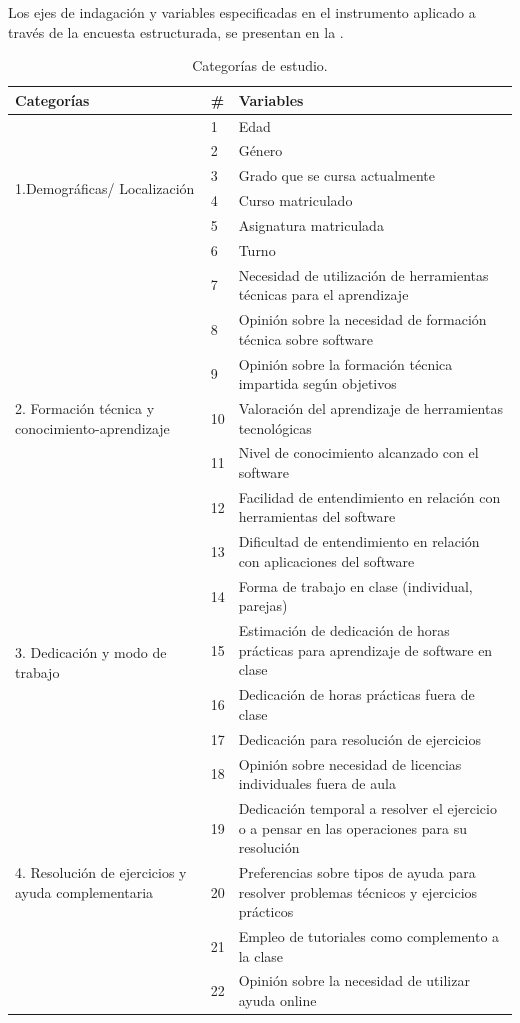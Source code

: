 \documentclass[spanish]{textolivre}
\begin{document}
Los ejes de indagación y variables especificadas en el instrumento aplicado a través de la encuesta estructurada, se presentan en la .

\begin{table}[h]
\centering\small
\begin{threeparttable}
\caption{Categorías de estudio.}
\label{tab-01}
\begin{tabular}{p{3cm} l p{10cm}}
\toprule
Categorías & \# & Variables \\
\midrule
\multirow[t]{6}{=}{1.Demográficas/ Localización} & 1 & Edad\\
	 & 2 & Género \\
	 & 3 & Grado que se cursa actualmente \\
	 & 4 & Curso matriculado\\
	 & 5 & Asignatura matriculada\\
  & 6 & Turno\\[2ex]
\multirow[t]{7}{=}{2. Formación técnica y conocimiento-aprendizaje} & 7 & Necesidad de utilización de herramientas técnicas para el aprendizaje\\
  & 8	& Opinión sobre la necesidad de formación técnica sobre software\\
  & 9	& Opinión sobre la formación técnica impartida según objetivos\\
  & 10 &Valoración del aprendizaje de herramientas tecnológicas\\
  & 11  & Nivel de conocimiento alcanzado con el software\\
  & 12 & Facilidad de entendimiento en relación con herramientas del software\\
  & 13 & Dificultad de entendimiento en relación con aplicaciones del software\\[4ex]
\multirow[t]{4}{=}{3. Dedicación y modo de trabajo} &  14 & Forma de trabajo en clase (individual, parejas)\\
  & 15 & Estimación de dedicación de horas prácticas para aprendizaje de software en clase\\
  & 16 & Dedicación de horas prácticas fuera de clase\\
  & 17 & Dedicación para resolución de ejercicios\\[2ex]
\multirow[t]{5}{=}{4. Resolución de ejercicios y ayuda complementaria} & 18 & Opinión sobre necesidad de licencias individuales fuera de aula \\
  & 19 & Dedicación temporal a resolver el ejercicio o a pensar en las operaciones para su resolución\\
  & 20 & Preferencias sobre tipos de ayuda para resolver problemas técnicos y ejercicios prácticos\\
  & 21 & Empleo de tutoriales como complemento a la clase\\
  & 22 & Opinión sobre la necesidad de utilizar ayuda online\\	
\bottomrule
\end{tabular}
\end{threeparttable}
\end{table}
\end{document}
